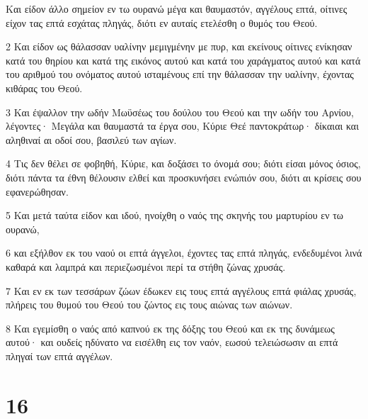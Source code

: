 \par Και είδον άλλο σημείον εν τω ουρανώ μέγα και θαυμαστόν, αγγέλους επτά, οίτινες είχον τας επτά εσχάτας πληγάς, διότι εν αυταίς ετελέσθη ο θυμός του Θεού.
\par 2 Και είδον ως θάλασσαν υαλίνην μεμιγμένην με πυρ, και εκείνους οίτινες ενίκησαν κατά του θηρίου και κατά της εικόνος αυτού και κατά του χαράγματος αυτού και κατά του αριθμού του ονόματος αυτού ισταμένους επί την θάλασσαν την υαλίνην, έχοντας κιθάρας του Θεού.
\par 3 Και έψαλλον την ωδήν Μωϋσέως του δούλου του Θεού και την ωδήν του Αρνίου, λέγοντες· Μεγάλα και θαυμαστά τα έργα σου, Κύριε Θεέ παντοκράτωρ· δίκαιαι και αληθιναί αι οδοί σου, βασιλεύ των αγίων.
\par 4 Τις δεν θέλει σε φοβηθή, Κύριε, και δοξάσει το όνομά σου; διότι είσαι μόνος όσιος, διότι πάντα τα έθνη θέλουσιν ελθεί και προσκυνήσει ενώπιόν σου, διότι αι κρίσεις σου εφανερώθησαν.
\par 5 Και μετά ταύτα είδον και ιδού, ηνοίχθη ο ναός της σκηνής του μαρτυρίου εν τω ουρανώ,
\par 6 και εξήλθον εκ του ναού οι επτά άγγελοι, έχοντες τας επτά πληγάς, ενδεδυμένοι λινά καθαρά και λαμπρά και περιεζωσμένοι περί τα στήθη ζώνας χρυσάς.
\par 7 Και εν εκ των τεσσάρων ζώων έδωκεν εις τους επτά αγγέλους επτά φιάλας χρυσάς, πλήρεις του θυμού του Θεού του ζώντος εις τους αιώνας των αιώνων.
\par 8 Και εγεμίσθη ο ναός από καπνού εκ της δόξης του Θεού και εκ της δυνάμεως αυτού· και ουδείς ηδύνατο να εισέλθη εις τον ναόν, εωσού τελειώσωσιν αι επτά πληγαί των επτά αγγέλων.

\chapter{16}

